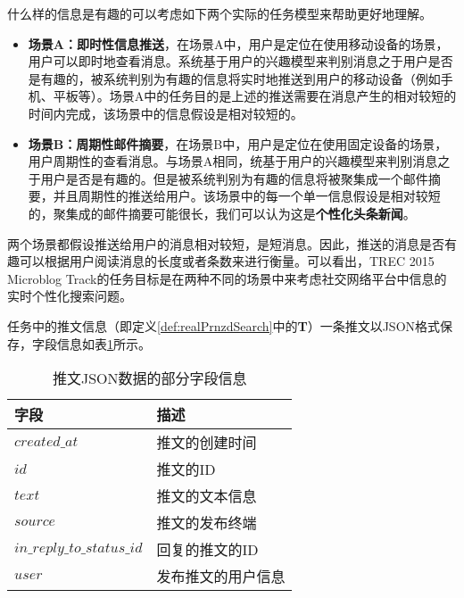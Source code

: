 什么样的信息是有趣的可以考虑如下两个实际的任务模型来帮助更好地理解。
\begin{itemize}
  \item \textbf{场景A：即时性信息推送}，在场景A中，用户是定位在使用移动设备的场景，用户可以即时地查看消息。系统基于用户的兴趣模型来判别消息之于用户是否是有趣的，被系统判别为有趣的信息将实时地推送到用户的移动设备（例如手机、平板等）。场景A中的任务目的是上述的推送需要在消息产生的相对较短的时间内完成，该场景中的信息假设是相对较短的。
  \item \textbf{场景B：周期性邮件摘要}，在场景B中，用户是定位在使用固定设备的场景，用户周期性的查看消息。与场景A相同，统基于用户的兴趣模型来判别消息之于用户是否是有趣的。但是被系统判别为有趣的信息将被聚集成一个邮件摘要，并且周期性的推送给用户。该场景中的每一个单一信息假设是相对较短的，聚集成的邮件摘要可能很长，我们可以认为这是\textbf{个性化头条新闻}。
\end{itemize}

两个场景都假设推送给用户的消息相对较短，是短消息。因此，推送的消息是否有趣可以根据用户阅读消息的长度或者条数来进行衡量。可以看出，TREC 2015 Microblog Track的任务目标是在两种不同的场景中来考虑社交网络平台中信息的实时个性化搜索问题。

任务中的推文信息（即定义\ref{def:realPrnzdSearch}中的\textbf{T}）一条推文以JSON格式保存，字段信息如表\ref{tab:tweetJSON}所示。
\begin{table}[!htbp]
\centering
\caption{推文JSON数据的部分字段信息}
\begin{tabular}{|p{4cm}|p{7cm}|}
\hline
\textbf{字段} & \textbf{描述} \\
\hline
$created\_at$ & 推文的创建时间\\
\hline
$id$ & 推文的ID\\
\hline
$text$ & 推文的文本信息\\
\hline
$source$ & 推文的发布终端\\
\hline
$in\_reply\_to\_status\_id$ & 回复的推文的ID\\
\hline
$user$ & 发布推文的用户信息\\
\hline
\end{tabular}
\label{tab:tweetJSON}
\end{table}


